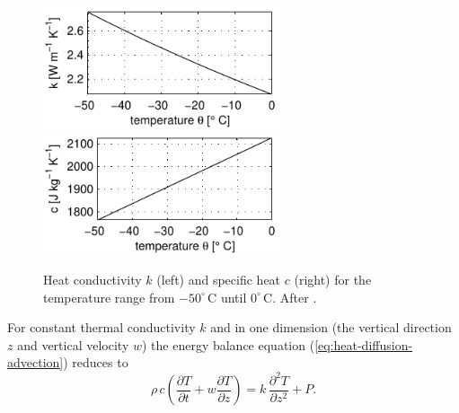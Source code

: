 \documentclass[11pt,a4paper,halfparskip]{scrartcl}
\newcommand{\cels}[1]{\ensuremath{#1^{\circ}\,\mathrm{C}}}
\newcommand{\ddz}[1]{\ensuremath{\frac{\partial #1}{\partial z}}}
\newcommand{\ddt}[1]{\ensuremath{\frac{\partial #1}{\partial t}}}
\begin{document}
\begin{figure}
  \centering
   \includegraphics[width=7cm]{figures/k} \hfill
   \includegraphics[width=7cm]{figures/c}
   \caption{Heat conductivity $k$ (left) and specific heat $c$ (right) for the temperature range from \cels{-50} until \cels{0}. After \cite{Ritz1987}.}
\end{figure}
%
For constant thermal conductivity $k$ and in one dimension (the vertical
direction $z$ and vertical velocity $w$) the energy balance equation
(\ref{eq:heat-diffusion-advection}) reduces to 
%
\begin{equation}
 \label{eq:heat-diffusion-advection-1d}
 \rho\, c \left(\ddt{T} + w \ddz{T}\right) =
 k\, \frac{\partial^2T}{\partial z^2} + P.
\end{equation}
\end{document}

